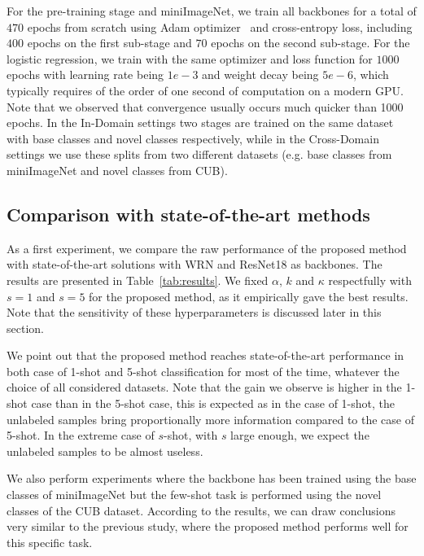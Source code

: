 \documentclass[a4paper,conference]{IEEEtran}
\begin{document}
For the pre-training stage and miniImageNet, we train all backbones for a total of $470$ epochs from scratch using Adam optimizer~\cite{kingma2014adam} and cross-entropy loss, including $400$ epochs on the first sub-stage and $70$ epochs on the second sub-stage. For the logistic regression, we train with the same optimizer and loss function for $1000$ epochs with learning rate being $1e-3$ and weight decay being $5e-6$, which typically requires of the order of one second of computation on a modern GPU. Note that we observed that convergence usually occurs much quicker than 1000 epochs. In the In-Domain settings two stages are trained on the same dataset with base classes and novel classes respectively, while in the Cross-Domain settings we use these splits from two different datasets (e.g. base classes from miniImageNet and novel classes from CUB).


\subsection{Comparison with state-of-the-art methods}

As a first experiment, we compare the raw performance of the proposed method with state-of-the-art solutions with WRN and ResNet18 as backbones. The results are presented in Table~\ref{tab:results}. We fixed $\alpha$, $k$ and $\kappa$ respectfully with $s=1$ and $s=5$ for the proposed method, as it empirically gave the best results. Note that the sensitivity of these hyperparameters is discussed later in this section.

We point out that the proposed method reaches state-of-the-art performance in both case of 1-shot and 5-shot classification for most of the time, whatever the choice of all considered datasets. Note that the gain we observe is higher in the 1-shot case than in the 5-shot case, this is expected as in the case of 1-shot, the unlabeled samples bring proportionally more information compared to the case of 5-shot. In the extreme case of $s$-shot, with $s$ large enough, we expect the unlabeled samples to be almost useless.

We also perform experiments where the backbone has been trained using the base classes of miniImageNet but the few-shot task is performed using the novel classes of the CUB dataset. According to the results, we can draw conclusions very similar to the previous study, where the proposed method performs well for this specific task.
\end{document}
